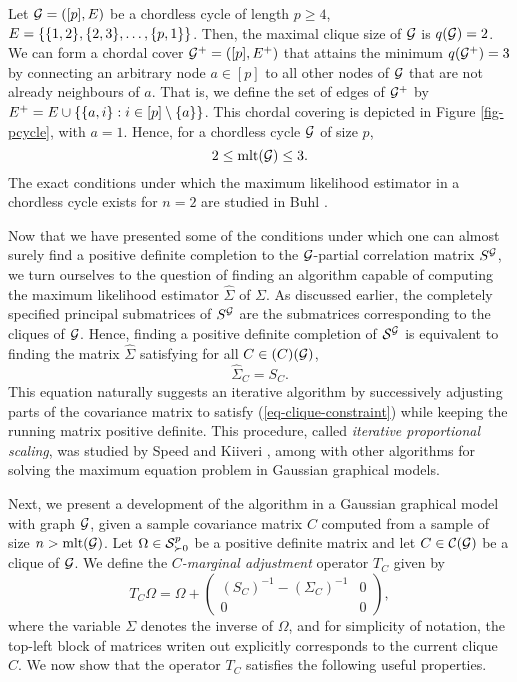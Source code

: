 \begin{example} \label{ex-pcycle}
    Let $\G = ([p], E)$ be a chordless cycle of length $p \geq 4$, $E = \eset{ \eset{1, 2}, \eset{2, 3}, \ldots, \eset{p, 1}}$. Then, the maximal clique size of $\G$ is $q(\G) = 2$. We can form a chordal cover $\G^+ = ([p], E^+)$ that attains the minimum $q(\G^+) = 3$ by connecting an arbitrary node $a \in [p]$ to all other nodes of $\G$ that are not already neighbours of $a$. That is, we define the set of edges of $\G^+$ by $E^+ = E \cup \eset{ \eset{a, i} : i \in [p] \setminus \eset{a}}$. This chordal covering is depicted in Figure \ref{fig-pcycle}, with $a = 1$. Hence, for a chordless cycle $\G$ of size $p$,
    \begin{equation*}
        2 \leq \t{mlt}(\G) \leq 3.
    \end{equation*}
    The exact conditions under which the maximum likelihood estimator in a chordless cycle exists for $n = 2$ are studied in Buhl \cite[Section 4]{Buhl1993OnTE}.
\end{example}


Now that we have presented some of the conditions under which one can almost surely find a positive definite completion to the $\G$-partial correlation matrix $S^\G$, we turn ourselves to the question of finding an algorithm capable of computing the maximum likelihood estimator $\hat\Sigma$ of $\Sigma$. As discussed earlier, the completely specified principal submatrices of $S^\G$ are the submatrices corresponding to the cliques of $\G$. Hence, finding a positive definite completion of $\S^\G$ is equivalent to finding the matrix $\hat\Sigma$ satisfying for all $C \in \c(C)(\G)$,
\begin{equation} \label{eq-clique-constraint}
    \hat\Sigma_C = S_C.
\end{equation}
This equation naturally suggests an iterative algorithm by successively adjusting parts of the covariance matrix to satisfy (\ref{eq-clique-constraint}) while keeping the running matrix positive definite. This procedure, called \textit{iterative proportional scaling}, was studied by Speed and Kiiveri \cite{speed1986gaussian}, among with other algorithms for solving the maximum equation problem in Gaussian graphical models.

Next, we present a development of the algorithm in a Gaussian graphical model with graph $\G$, given a sample covariance matrix $C$ computed from a sample of size $n > \t{mlt}(\G)$. Let $\Omega \in \S^p_{\succ 0}$ be a positive definite matrix and let $C \in \c{C}(\G)$ be a clique of $\G$. We define the \textit{$C$-marginal adjustment} operator $T_C$ given by
\begin{equation} \label{eq-tc-1}
    T_C \Omega = \Omega + \begin{pmatrix}
        (S_C)^{-1} - (\Sigma_C)^{-1} & 0\\
        0 & 0 
        \end{pmatrix},
\end{equation}
where the variable $\Sigma$ denotes the inverse of $\Omega$, and for simplicity of notation, the top-left block of matrices writen out explicitly corresponds to the current clique $C$. We now show that the operator $T_C$ satisfies the following useful properties.


